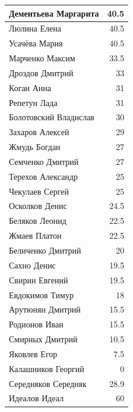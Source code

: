 \documentclass[12pt]{article}
\newlength{\h}
\begin{document}
\begin{table}[ht]
\begin{minipage}[t]{0.48\linewidth}
\begin{tabular}{|l|r|}
      \hline
      Дементьева Маргарита   &   40.5  \\
      \hline
      Люлина Елена           &   40.5  \\
      \hline
      Усачёва Мария          &   40.5  \\
      \hline
      Марченко Максим        &   33.5  \\
      \hline
      Дроздов Дмитрий        &    33  \\
      \hline
      Коган Анна             &    31  \\
      \hline
      Репетун Лада           &    31  \\
      \hline
      Болотовский Владислав  &    30  \\
      \hline
      Захаров Алексей        &    29  \\
      \hline
      Жмудь Богдан           &     27  \\
      \hline
      Семченко Дмитрий       &     27  \\
      \hline
      Терехов Александр      &    25  \\
      \hline
      Чекулаев Сергей        &    25  \\
      \hline
      Осколков Денис         &   24.5  \\
      \hline
      Беляков Леонид         &   22.5  \\
      \hline
      Жмаев Платон           &   22.5  \\
      \hline
      Беличенко Дмитрий      &    20  \\
      \hline
      Сахно Денис            &   19.5  \\
      \hline
      Свирин Евгений         &   19.5  \\
      \hline
      Евдокимов Тимур        &    18  \\
      \hline
      Арутюнян Дмитрий       &   15.5  \\
      \hline
      Родионов Иван          &   15.5  \\
      \hline
      Смирных Дмитрий        &   10.5  \\
      \hline
      Яковлев Егор           &    7.5  \\
      \hline
      Калашников Георгий     &      0  \\
      \hline
      Середняков Середняк    &   28.9  \\
      Идеалов Идеал          &     60  \\
      \hline
    \end{tabular}
  \end{minipage}
\end{table}
\end{document}
